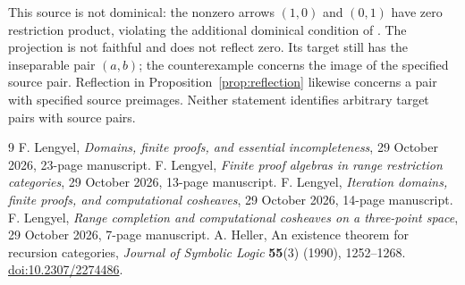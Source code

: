 \documentclass[11pt]{article}
\begin{document}
This source is not dominical: the nonzero arrows $(1,0)$ and $(0,1)$
have zero restriction product, violating the additional dominical
condition of \cite[Proposition 5.1(ii)]{Heller}.
The projection is not faithful and does not reflect zero. Its target
still has the inseparable pair $(a,b)$; the counterexample concerns
the image of the specified source pair. Reflection in
Proposition~\ref{prop:reflection} likewise concerns a pair with specified
source preimages. Neither statement identifies arbitrary target pairs
with source pairs.

\begin{thebibliography}{9}
 F. Lengyel, \emph{Domains, finite proofs, and essential
incompleteness}, 29 October 2026, 23-page manuscript.
 F. Lengyel, \emph{Finite proof algebras in range
restriction categories}, 29 October 2026, 13-page manuscript.
 F. Lengyel, \emph{Iteration domains, finite proofs,
and computational cosheaves}, 29 October 2026, 14-page manuscript.
 F. Lengyel, \emph{Range completion and computational
cosheaves on a three-point space}, 29 October 2026, 7-page manuscript.
 A. Heller, An existence theorem for recursion categories,
\emph{Journal of Symbolic Logic} \textbf{55}(3) (1990), 1252--1268.
\href{https://doi.org/10.2307/2274486}{doi:10.2307/2274486}.
\end{thebibliography}
\end{document}
